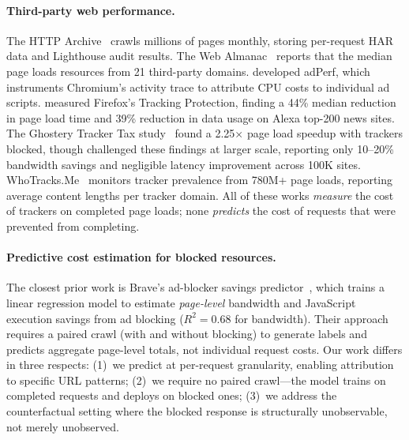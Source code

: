 \documentclass[sigconf,nonacm]{acmart}
\begin{document}
\paragraph{Third-party web performance.}
The HTTP Archive~\cite{httparchive} crawls millions of pages monthly, storing per-request HAR data and Lighthouse audit results.
The Web Almanac~\cite{webalmanac2022} reports that the median page loads resources from 21 third-party domains.
\citet{pourghassemi2021adperf} developed adPerf, which instruments Chromium's activity trace to attribute CPU costs to individual ad scripts.
\citet{kontaxis2015tracking} measured Firefox's Tracking Protection, finding a 44\% median reduction in page load time and 39\% reduction in data usage on Alexa top-200 news sites.
The Ghostery Tracker Tax study~\cite{ghostery2020tracker} found a 2.25$\times$ page load speedup with trackers blocked, though \citet{castelluroz2020demystifying} challenged these findings at larger scale, reporting only 10--20\% bandwidth savings and negligible latency improvement across 100K sites.
WhoTracks.Me~\cite{karaj2018whotracksme} monitors tracker prevalence from 780M+ page loads, reporting average content lengths per tracker domain.
All of these works \emph{measure} the cost of trackers on completed page loads; none \emph{predicts} the cost of requests that were prevented from completing.

\paragraph{Predictive cost estimation for blocked resources.}
The closest prior work is Brave's ad-blocker savings predictor~\cite{brave2019savings}, which trains a linear regression model to estimate \emph{page-level} bandwidth and JavaScript execution savings from ad blocking ($R^2 = 0.68$ for bandwidth).
Their approach requires a paired crawl (with and without blocking) to generate labels and predicts aggregate page-level totals, not individual request costs.
Our work differs in three respects: (1)~we predict at per-request granularity, enabling attribution to specific URL patterns; (2)~we require no paired crawl---the model trains on completed requests and deploys on blocked ones; (3)~we address the counterfactual setting where the blocked response is structurally unobservable, not merely unobserved.
\end{document}
